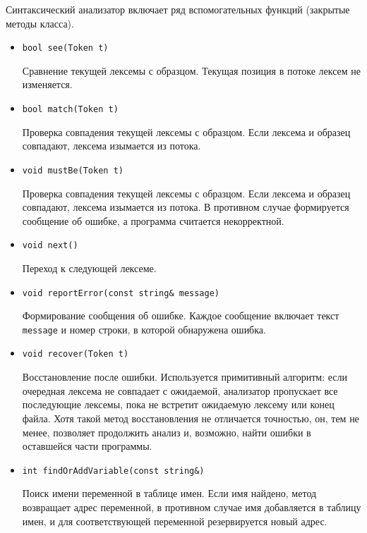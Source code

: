 \documentclass[a4paper,12pt]{article}
\begin{document}
Синтаксический анализатор включает ряд вспомогательных функций (закрытые методы
класса).

\begin{itemize}
\item \texttt{bool see(Token t)}

      Сравнение текущей лексемы с образцом. Текущая позиция в потоке лексем не
      изменяется.

\item \texttt{bool match(Token t)}

      Проверка совпадения текущей лексемы с образцом. Если лексема и образец
      совпадают, лексема изымается из потока.

\item \texttt{void mustBe(Token t)}

      Проверка совпадения текущей лексемы с образцом. Если лексема и образец
      совпадают, лексема изымается из потока. В противном случае формируется
      сообщение об ошибке, а программа считается некорректной.

\item \texttt{void next()}

      Переход к следующей лексеме.

\item \texttt{void reportError(const string\& message)}

      Формирование сообщения об ошибке. Каждое сообщение включает текст
      \texttt{message} и номер строки, в которой обнаружена ошибка.

\item \texttt{void recover(Token t)}

      Восстановление после ошибки. Используется примитивный алгоритм: если
      очередная лексема не совпадает с ожидаемой, анализатор пропускает все
      последующие лексемы, пока не встретит ожидаемую лексему или
      конец файла. Хотя такой метод восстановления не отличается точностью, он,
      тем не менее, позволяет продолжить анализ и, возможно, найти ошибки в
      оставшейся части программы.

\item \texttt{int findOrAddVariable(const string\&)}

      Поиск имени переменной в таблице имен. Если имя найдено, метод возвращает
      адрес переменной, в противном случае имя добавляется в таблицу имен, и для
      соответствующей переменной резервируется новый адрес.
\end{itemize}
\end{document}

